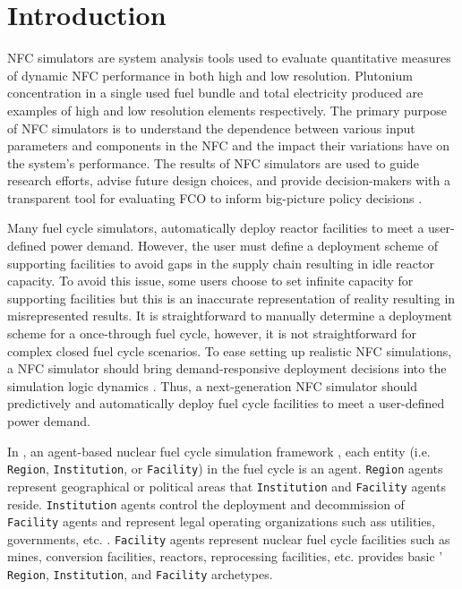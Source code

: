 \section{Introduction}
\gls{NFC} simulators are system analysis tools used to evaluate 
quantitative measures of dynamic \gls{NFC} performance 
in both high and low resolution. 
Plutonium concentration in a single used fuel bundle and 
total electricity produced are examples of high and low 
resolution elements respectively.  
The primary purpose of \gls{NFC} simulators is to understand the 
dependence between various input parameters and components 
in the \gls{NFC} and the impact their variations have on 
the system's performance. 
The results of \gls{NFC} simulators are used to guide research 
efforts, advise future design choices, and provide 
decision-makers with a transparent tool for evaluating \gls{FCO} 
to inform big-picture policy decisions \cite{yacout_modeling_2005}.

Many fuel cycle simulators, automatically deploy reactor facilities 
to meet a user-defined power demand. 
However, the user must define a deployment scheme of 
supporting facilities to avoid gaps in the supply 
chain resulting in idle reactor capacity. 
To avoid this issue, some users choose to set infinite capacity 
for supporting facilities but this is an inaccurate 
representation of reality resulting in misrepresented results. 
It is straightforward to manually determine a deployment scheme 
for a once-through fuel cycle, however, it is not straightforward
for complex closed fuel cycle scenarios.  
To ease setting up realistic \gls{NFC} simulations, a \gls{NFC} simulator
should bring demand-responsive deployment decisions into 
the simulation logic dynamics \cite{huff_current_2017}. 
Thus, a next-generation \gls{NFC} simulator should predictively and 
automatically deploy fuel cycle facilities to meet a user-defined 
power demand. 

In \Cyclus, an agent-based nuclear fuel cycle simulation framework 
\cite{huff_fundamental_2016}, 
each entity (i.e. \texttt{Region}, \texttt{Institution}, or \texttt{Facility}) in the 
fuel cycle is an agent. 
\texttt{Region} agents represent geographical or political areas that \texttt{Institution}
and \texttt{Facility} agents reside. 
\texttt{Institution} agents control the 
deployment and decommission of \texttt{Facility} agents 
and represent legal operating organizations such ass
utilities, governments, etc. \cite{huff_fundamental_2016}. 
\texttt{Facility} agents represent nuclear fuel cycle facilities
such as mines, conversion facilities, reactors, reprocessing facilities, 
etc. 
\Cycamore \cite{carlsen_cycamore_2014}
provides basic \Cyclus' \texttt{Region}, \texttt{Institution}, 
and \texttt{Facility} archetypes. 

